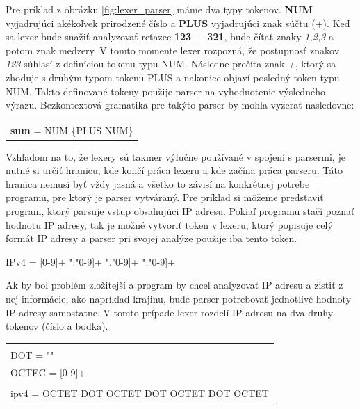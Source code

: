 Pre príklad z obrázku \ref{fig:lexer_parser}  máme dva typy tokenov. \textbf{NUM} vyjadrujúci akékoľvek prirodzené číslo a \textbf{PLUS} vyjadrujúci znak súčtu (+). Keď sa lexer bude snažiť analyzovať reťazec \textbf{123 + 321}, bude čítať znaky \textit{1,2,3} a potom znak medzery. V tomto momente lexer rozpozná, že postupnosť znakov \textit{123} súhlasí z definíciou tokenu typu NUM. Následne prečíta znak \textit{+}, ktorý sa zhoduje s druhým typom tokenu PLUS a nakoniec objaví posledný token typu NUM. Takto definované tokeny použije parser na vyhodnotenie výsledného výrazu. Bezkontextová gramatika pre takýto parser by mohla vyzerať nasledovne:

\begin{center}
\begin{tabular}{p{}}
\textbf{sum} = NUM \{PLUS NUM\}
\end{tabular}
\end{center}

Vzhľadom na to, že lexery sú takmer výlučne používané v spojení s parsermi, je nutné si určiť hranicu, kde končí práca lexeru a kde začína práca parseru. Táto hranica nemusí byť vždy jasná a všetko to závisí na konkrétnej potrebe programu, pre ktorý je parser vytváraný. Pre príklad si môžeme predstaviť program, ktorý parsuje vstup obsahujúci IP adresu. Pokiaľ programu stačí poznať hodnotu IP adresy, tak je možné vytvoriť token v lexeru, ktorý popisuje celý formát IP adresy a parser pri svojej analýze použije iba tento token. 
\begin{center}
IPv4 = [0-9]+ "."\text{ [}0-9]+ "."\text{ [}0-9]+ "."\text{ [}0-9]+
\end{center}

Ak by bol problém zložitejší a program by chcel analyzovať IP adresu a zistiť z nej informácie, ako napríklad krajinu, bude parser potrebovať jednotlivé hodnoty IP adresy samostatne. V tomto prípade lexer rozdelí IP adresu na dva druhy tokenov (číslo a bodka).

\begin{center}
\begin{tabular}{p{}}
\color{editorGray}{/* Lexer */}\\
DOT   = "\text{.}"\\
OCTEC = [0-9]+\\
\color{editorGray}{/* Parser */}\\
ipv4  = OCTET DOT OCTET DOT OCTET DOT OCTET
\end{tabular}
\end{center}

